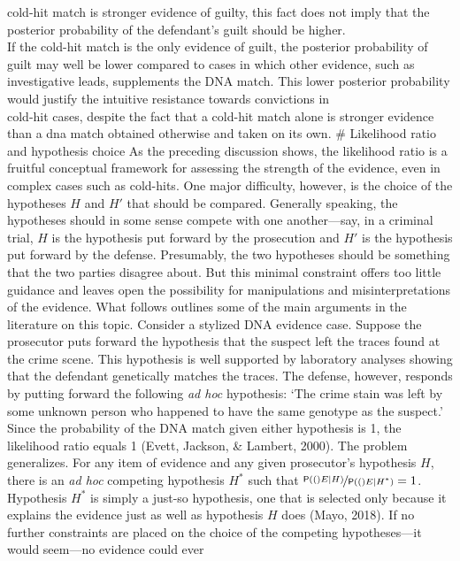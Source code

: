 \documentclass[10pt,dvipsnames,enabledeprecatedfontcommands]{scrartcl}
\newcommand{\pr}[1]{\mathsf{P}(#1)}
\begin{document}
cold-hit match is stronger evidence of guilty, this fact does not imply
that the posterior probability of the defendant's guilt should be
higher.\\
If the cold-hit match is the only evidence of guilt, the posterior
probability of guilt may well be lower compared to cases in which other
evidence, such as investigative leads, supplements the DNA match. This
lower posterior probability would justify the intuitive resistance
towards convictions in\\
cold-hit cases, despite the fact that a cold-hit match alone is stronger
evidence than a dna match obtained otherwise and taken on its own. \#
Likelihood ratio and hypothesis choice
\label{subsec:LRandHypothesisChoice} As the preceding discussion shows,
the likelihood ratio is a fruitful conceptual framework for assessing
the strength of the evidence, even in complex cases such as cold-hits.
One major difficulty, however, is the choice of the hypotheses \(H\) and
\(H'\) that should be compared. Generally speaking, the hypotheses
should in some sense compete with one another---say, in a criminal
trial, \(H\) is the hypothesis put forward by the prosecution and \(H'\)
is the hypothesis put forward by the defense. Presumably, the two
hypotheses should be something that the two parties disagree about. But
this minimal constraint offers too little guidance and leaves open the
possibility for manipulations and misinterpretations of the evidence.
What follows outlines some of the main arguments in the literature on
this topic. Consider a stylized DNA evidence case. Suppose the
prosecutor puts forward the hypothesis that the suspect left the traces
found at the crime scene. This hypothesis is well supported by
laboratory analyses showing that the defendant genetically matches the
traces. The defense, however, responds by putting forward the following
\textit{ad hoc} hypothesis: `The crime stain was left by some unknown
person who happened to have the same genotype as the suspect.' Since the
probability of the DNA match given either hypothesis is 1, the
likelihood ratio equals 1 (Evett, Jackson, \& Lambert, 2000). The
problem generalizes. For any item of evidence and any given prosecutor's
hypothesis \(H\), there is an \textit{ad hoc} competing hypothesis
\(H^*\) such that \(\nicefrac{\pr(E \vert H)}{\pr(E \vert H^*)}=1\).
Hypothesis \(H^*\) is simply a just-so hypothesis, one that is selected
only because it explains the evidence just as well as hypothesis \(H\)
does (Mayo, 2018). If no further constraints are placed on the choice of
the competing hypotheses---it would seem---no evidence could ever
\end{document}
